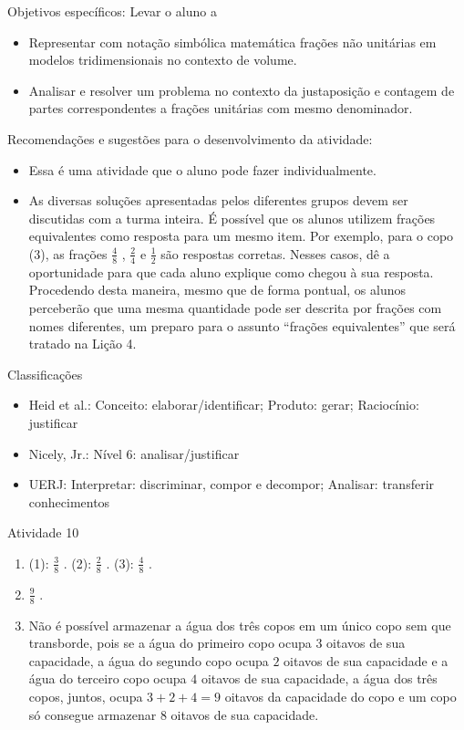 \documentclass[oneside]{book}
\begin{document}
\begin{multicols}{2}
  Objetivos específicos: Levar o aluno a
\begin{itemize} %
    \item       Representar com notação simbólica matemática frações não unitárias em modelos tridimensionais no contexto de volume.
    \item       Analisar e resolver um problema no contexto da justaposição e contagem de partes correspondentes a frações unitárias com mesmo denominador.
\end{itemize} %


  Recomendações e sugestões para o desenvolvimento da atividade:
\begin{itemize} %
    \item       Essa é uma atividade que o aluno pode fazer individualmente.
    \item       As diversas soluções apresentadas pelos diferentes grupos devem ser discutidas com a turma inteira. É possível que os alunos utilizem frações equivalentes como resposta para um mesmo item. Por exemplo, para o copo (3), as frações       $\frac{4}{8}$      ,       $\frac{2}{4}$       e       $\frac{1}{2}$       são respostas corretas. Nesses casos, dê a oportunidade para que cada aluno explique como chegou à sua resposta. Procedendo desta maneira, mesmo que de forma pontual, os alunos perceberão que uma mesma quantidade pode ser descrita por frações com nomes diferentes, um preparo para o assunto       ``frações equivalentes''       que será tratado na Lição 4.
\end{itemize} %


  Classificações
\begin{itemize} %
    \item       Heid et al.: Conceito: elaborar/identificar; Produto: gerar; Raciocínio: justificar
    \item       Nicely, Jr.: Nível 6: analisar/justificar
    \item       UERJ: Interpretar: discriminar, compor e decompor; Analisar: transferir conhecimentos
\end{itemize} %


\begin{resposta*}{Atividade 10}
\begin{enumerate} [\quad a)] %
    \item       (1):       $\frac{3}{8}$      . (2):       $\frac{2}{8}$      . (3):       $\frac{4}{8}$      .
    \item             $\frac{9}{8}$      .
    \item       Não é possível armazenar a água dos três copos em um único copo sem que transborde, pois se a água do primeiro copo ocupa       $3$       oitavos de sua capacidade, a água do segundo copo ocupa       $2$       oitavos de sua capacidade e a água do terceiro copo ocupa       $4$       oitavos de sua capacidade, a água dos três copos, juntos, ocupa       $3 + 2 + 4 = 9$       oitavos da capacidade do copo e um copo só consegue armazenar       $8$       oitavos de sua capacidade.
\end{enumerate} %


\end{resposta*}
\end{multicols}
\end{document}
